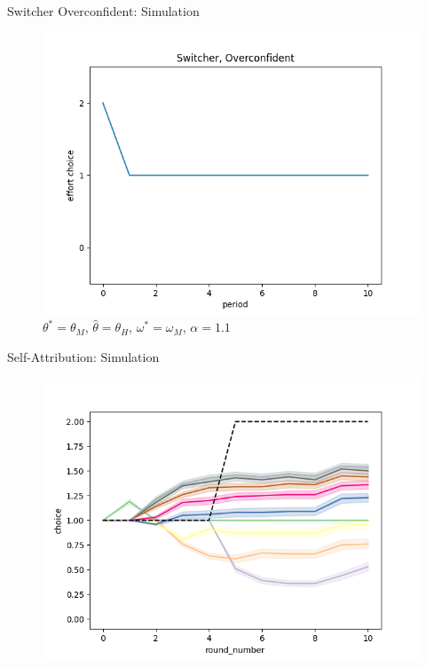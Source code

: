 \documentclass[aspectratio=169]{beamer}
\begin{document}
\begin{frame}{Switcher Overconfident: Simulation}
    \begin{figure}
        \centering
        \includegraphics[scale=.5]{switcher_over_11.png}
        \caption{$\theta^*=\theta_M$, $\hat\theta=\theta_H$, $\omega^*=\omega_M$, $\alpha= 1.1$}
    \end{figure}
    \label{switcherpath}
\end{frame}

\begin{frame}{Self-Attribution: Simulation}
    \begin{figure}
        \centering
        \includegraphics[scale=.5]{self-serving_11.png}
    
    \end{figure}
    \label{ss}
\end{frame}
\end{document}
